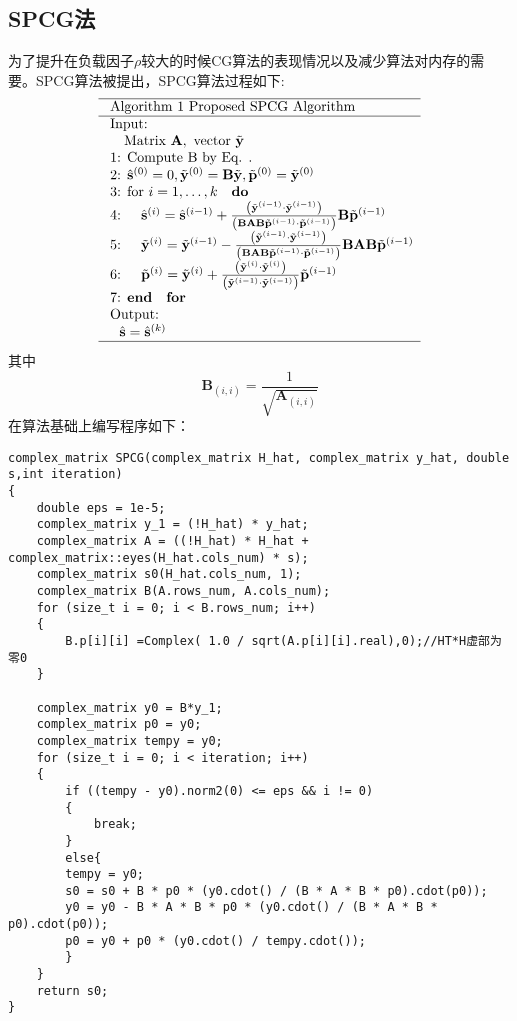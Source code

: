 \documentclass[twocolumn]{ctexart}
\begin{document}
\subsection{SPCG法}
\par 为了提升在负载因子$ \rho $较大的时候CG算法的表现情况以及减少算法对内存的需要。SPCG算法被提出，SPCG算法过程如下:
\[\begin{array}{l}
\hline \text { Algorithm 1 Proposed SPCG Algorithm } \\
\hline \text { Input: } \\
\quad \text { Matrix } \mathbf{A}, \text { vector } \tilde{\mathbf{y}} \\
\text { 1: Compute B by Eq. } . \\
\text { 2: } \hat{\mathbf{s}}^{(0)}=0, \tilde{\mathbf{y}}^{(0)}=\mathbf{B} \tilde{\mathbf{y}}, \tilde{\mathbf{p}}^{(0)}=\tilde{\mathbf{y}}^{(0)} \\
\text { 3: for } i=1, \ldots, k \quad \mathbf{d o} \\
\text { 4: } \quad \hat{\mathbf{s}}^{(i)}=\hat{\mathbf{s}}^{(i-1)}+\frac{\left(\tilde{\mathbf{y}}^{(i-1)} \cdot \tilde{\mathbf{y}}^{(i-1)}\right)}{\left(\mathbf{B A B} \tilde{\mathbf{p}}^{(i-1)} \cdot \tilde{\mathbf{p}}^{(i-1)}\right)} \mathbf{B} \tilde{\mathbf{p}}^{(i-1)} \\
\text { 5: } \quad \tilde{\mathbf{y}}^{(i)}=\tilde{\mathbf{y}}^{(i-1)}-\frac{\left(\tilde{\mathbf{y}}^{(i-1)} \cdot \tilde{\mathbf{y}}^{(i-1)}\right)}{\left(\mathbf{B A B} \tilde{\mathbf{p}}^{(i-1)} \cdot \tilde{\mathbf{p}}^{(i-1)}\right)} \mathbf{B A B} \tilde{\mathbf{p}}^{(i-1)} \\
\text { 6: } \quad \tilde{\mathbf{p}}^{(i)}=\tilde{\mathbf{y}}^{(i)}+\frac{\left(\tilde{\mathbf{y}}^{(i)} \cdot \tilde{\mathbf{y}}^{(i)}\right)}{\left(\tilde{\mathbf{y}}^{(i-1)} \cdot \tilde{\mathbf{y}}^{(i-1)}\right)} \tilde{\mathbf{p}}^{(i-1)} \\
\text { 7: } \mathbf{e n d}\quad \mathbf{f o r} \\
\text { Output: } \\
\quad \hat{\mathbf{s}}=\hat{\mathbf{s}}^{(k)}\\
\hline
\end{array}\]
其中
\[\mathbf{B}_{(i, i)}=\frac{1}{\sqrt{\mathbf{A}_{(i, i)}}}\]
在算法基础上编写程序如下：
\begin{lstlisting}
complex_matrix SPCG(complex_matrix H_hat, complex_matrix y_hat, double s,int iteration)
{
	double eps = 1e-5;
	complex_matrix y_1 = (!H_hat) * y_hat;
	complex_matrix A = ((!H_hat) * H_hat + complex_matrix::eyes(H_hat.cols_num) * s);
	complex_matrix s0(H_hat.cols_num, 1);
	complex_matrix B(A.rows_num, A.cols_num);
	for (size_t i = 0; i < B.rows_num; i++)
	{
		B.p[i][i] =Complex( 1.0 / sqrt(A.p[i][i].real),0);//HT*H虚部为零0
	}

	complex_matrix y0 = B*y_1;
	complex_matrix p0 = y0;
	complex_matrix tempy = y0;
	for (size_t i = 0; i < iteration; i++)
	{
		if ((tempy - y0).norm2(0) <= eps && i != 0)
		{
			break;
		}
		else{
		tempy = y0;
		s0 = s0 + B * p0 * (y0.cdot() / (B * A * B * p0).cdot(p0));
		y0 = y0 - B * A * B * p0 * (y0.cdot() / (B * A * B * p0).cdot(p0));
		p0 = y0 + p0 * (y0.cdot() / tempy.cdot()); 
		}	
	}
	return s0;
}
\end{lstlisting}
\end{document}
